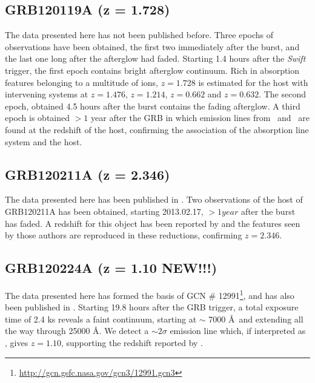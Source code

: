 \documentclass{aa}    %
\begin{document}
\subsection{GRB120119A (z = 1.728)}
The data presented here has not been published before. Three epochs of
observations have been obtained, the first two immediately after the burst, and
the last one long after the afterglow had faded. Starting 1.4 hours after the
\textit{Swift} trigger, the first epoch contains bright afterglow continuum.
Rich in absorption features belonging to a multitude of ions, $z =	1.728$ is
estimated for the host with intervening systems at $z =	1.476$, $z = 1.214$, $z
= 0.662$ and $z = 0.632$. The second epoch, obtained 4.5 hours after the burst
contains the fading afterglow. A third epoch is obtained $>1$ year after the
GRB in which emission lines from \hb~and \ha~are found at the redshift of the
host, confirming the association of the absorption line system and the host.

\subsection{GRB120211A (z = 2.346)}
The data presented here has been published in \citet{Kruhler2015}. Two
observations of the host of GRB120211A has been obtained, starting 2013.02.17,
$> 1 year$ after the burst has faded. A redshift for this object has been
reported by \citet{Kruhler2015} and the features seen by those authors are
reproduced in these reductions, confirming $z =	2.346$.

\subsection{GRB120224A (z = 1.10 NEW!!!)}
The data presented here has formed the basis of GCN \#
12991\footnote{\url{http://gcn.gsfc.nasa.gov/gcn3/12991.gcn3}}, and has also
been published in \citet{Kruhler2015}. Starting 19.8 hours after the GRB
trigger, a total exposure time of 2.4 ks reveals a faint continuum, starting at
$\sim$ 7000 \AA~and extending all the way through 25000 \AA. We detect a $\sim
2 \sigma$ emission line which, if interpreted as \ha, gives $z = 1.10$,
supporting the redshift reported by \citet{Kruhler2015}.
\end{document}
